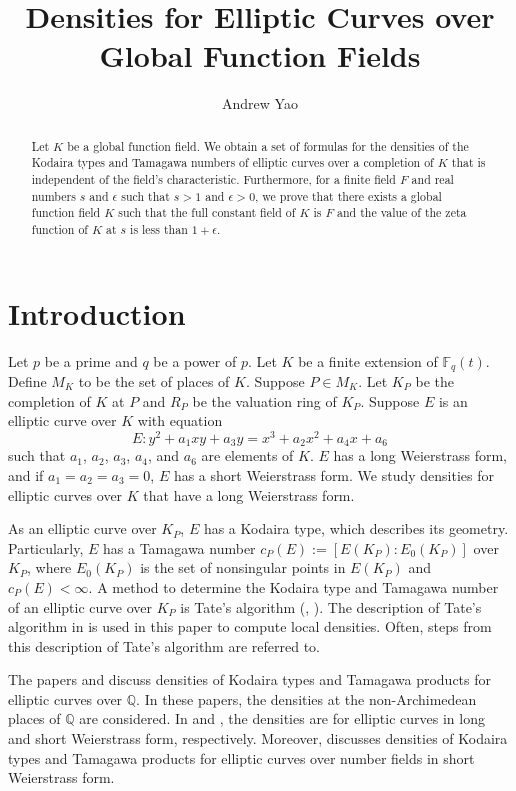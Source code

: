 \documentclass[12pt,letterpaper]{amsart}
\title{Densities for Elliptic Curves over Global Function Fields}
\author{Andrew Yao}
\theoremstyle{definition}
\begin{document}
\begin{abstract}
Let $K$ be a global function field. We obtain a set of formulas for the densities of the Kodaira types and Tamagawa numbers of elliptic curves over a completion of $K$ that is independent of the field's characteristic. Furthermore, for a finite field $F$ and real numbers $s$ and $\epsilon$ such that $s>1$ and $\epsilon>0$, we prove that there exists a global function field $K$ such that the full constant field of $K$ is $F$ and the value of the zeta function of $K$ at $s$ is less than $1+\epsilon$.
\end{abstract}

\maketitle

\section{Introduction}
\label{sec:introduction}

Let $p$ be a prime and $q$ be a power of $p$. Let $K$ be a finite extension of $\mathbb{F}_q(t)$. Define $M_K$ to be the set of places of $K$. Suppose $P\in M_K$. Let $K_P$ be the completion of $K$ at $P$ and $R_P$ be the valuation ring of $K_P$. Suppose $E$ is an elliptic curve over $K$ with equation
\[
E: y^2+a_1xy+a_3y=x^3+a_2x^2+a_4x+a_6
\]
such that $a_1$, $a_2$, $a_3$, $a_4$, and $a_6$ are elements of $K$. $E$ has a long Weierstrass form, and if $a_1=a_2=a_3=0$, $E$ has a short Weierstrass form. We study densities for elliptic curves over $K$ that have a long Weierstrass form. 

As an elliptic curve over $K_P$, $E$ has a Kodaira type, which describes its geometry. Particularly, $E$ has a Tamagawa number $c_P(E):=[E(K_P):E_0(K_P)]$ over $K_P$, where $E_0(K_P)$ is the set of nonsingular points in $E(K_P)$ and $c_P(E)<\infty$. A method to determine the Kodaira type and Tamagawa number of an elliptic curve over $K_P$ is Tate's algorithm (\cite{AdvancedTopicsEC}, \cite{TateAlgorithm}). The description of Tate's algorithm in \cite{AdvancedTopicsEC} is used in this paper to compute local densities. Often, steps from this description of Tate's algorithm are referred to.

The papers \cite{localglobal} and \cite{ProdRationals} discuss densities of Kodaira types and Tamagawa products for elliptic curves over $\mathbb{Q}$. In these papers, the densities at the non-Archimedean places of $\mathbb{Q}$ are considered. In \cite{localglobal} and \cite{ProdRationals}, the densities are for elliptic curves in long and short Weierstrass form, respectively. Moreover, \cite{ProdNF} discusses densities of Kodaira types and Tamagawa products for elliptic curves over number fields in short Weierstrass form. 
\end{document}
